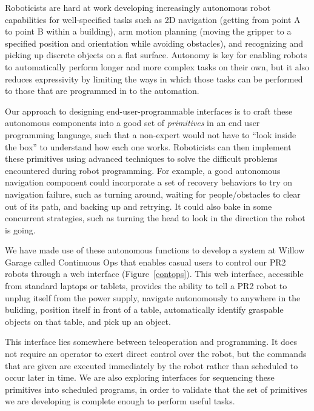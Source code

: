 \documentclass[11pt,twocolumn]{article}
\begin{document}
Roboticists are hard at work developing increasingly autonomous robot capabilities for well-specified tasks such as 2D navigation (getting from point A to point B within a building), arm motion planning (moving the gripper to a specified position and orientation while avoiding obstacles), and recognizing and picking up discrete objects on a flat surface. Autonomy is key for enabling robots to automatically perform longer and more complex tasks on their own, but it also reduces expressivity by limiting the ways in which those tasks can be performed to those that are programmed in to the automation.

Our approach to designing end-user-programmable interfaces is to craft these autonomous components into a good set of {\em primitives} in an end user programming language, such that a non-expert would not have to ``look inside the box'' to understand how each one works. Roboticists can then implement these primitives using advanced techniques to solve the difficult problems encountered during robot programming. For example, a good autonomous navigation component could incorporate a set of recovery behaviors to try on navigation failure, such as turning around, waiting for people/obstacles to clear out of its path, and backing up and retrying. It could also bake in some concurrent strategies, such as turning the head to look in the direction the robot is going. 


We have made use of these autonomous functions to develop a system at Willow Garage called Continuous Ops that enables casual users to control our PR2 robots through a web interface (Figure~\ref{contops}). This web interface, accessible from standard laptops or tablets, provides the ability to tell a PR2 robot to unplug itself from the power supply, navigate autonomously to anywhere in the buliding, position itself in front of a table, automatically identify graspable objects on that table, and pick up an object.

This interface lies somewhere between teleoperation and programming. It does not require an operator to exert direct control over the robot, but the commands that are given are executed immediately by the robot rather than scheduled to occur later in time. We are also exploring interfaces for sequencing these primitives into scheduled programs, in order to validate that the set of primitives we are developing is complete enough to perform useful tasks.
\end{document}
